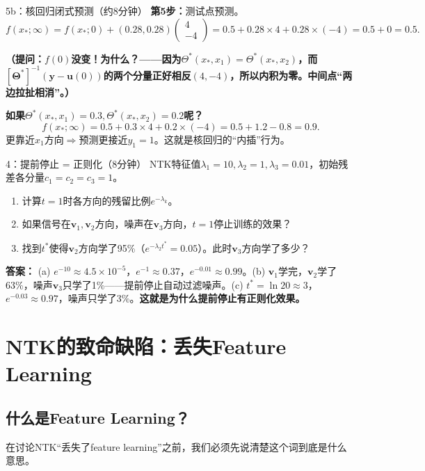 \documentclass[11pt,a4paper]{article}
\newcommand{\bTheta}{\boldsymbol{\Theta}}
\newcommand{\bu}{\mathbf{u}}
\newcommand{\by}{\mathbf{y}}
\newcommand{\bv}{\mathbf{v}}
\begin{document}
\begin{handcalc}{5b：核回归闭式预测（约8分钟）}
\textbf{第5步：}测试点预测。
\[
f(x_*;\infty) = f(x_*;0) + (0.28, 0.28)\begin{pmatrix}4\\-4\end{pmatrix} = 0.5 + 0.28\times 4 + 0.28\times(-4) = 0.5 + 0 = 0.5.
\]

\textbf{（提问：$f(0)$没变！为什么？——因为$\Theta^*(x_*,x_1)=\Theta^*(x_*,x_2)$，而$[\bTheta^*]^{-1}(\by-\bu(0))$的两个分量正好相反$(4,-4)$，所以内积为零。中间点``两边拉扯相消''。）}

\textbf{如果$\Theta^*(x_*,x_1)=0.3, \Theta^*(x_*,x_2)=0.2$呢？}
\[
f(x_*;\infty) = 0.5 + 0.3\times 4 + 0.2\times(-4) = 0.5 + 1.2 - 0.8 = 0.9.
\]
更靠近$x_1$方向$\Rightarrow$预测更接近$y_1=1$。这就是核回归的``内插''行为。
\end{handcalc}

\begin{classexercise}{4：提前停止 = 正则化（8分钟）}
NTK特征值$\lambda_1=10, \lambda_2=1, \lambda_3=0.01$，初始残差各分量$c_1=c_2=c_3=1$。
\begin{enumerate}[label=(\alph*)]
\item 计算$t=1$时各方向的残留比例$e^{-\lambda_k}$。
\item 如果信号在$\bv_1,\bv_2$方向，噪声在$\bv_3$方向，$t=1$停止训练的效果？
\item 找到$t^*$使得$\bv_2$方向学了95\%（$e^{-\lambda_2 t^*}=0.05$）。此时$\bv_3$方向学了多少？
\end{enumerate}

\textbf{答案：} (a) $e^{-10}\approx 4.5\times 10^{-5}$，$e^{-1}\approx 0.37$，$e^{-0.01}\approx 0.99$。(b) $\bv_1$学完，$\bv_2$学了63\%，噪声$\bv_3$只学了1\%——提前停止自动过滤噪声。(c) $t^*=\ln 20\approx 3$，$e^{-0.03}\approx 0.97$，噪声只学了3\%。\textbf{这就是为什么提前停止有正则化效果。}
\end{classexercise}

\section{NTK的致命缺陷：丢失Feature Learning}

\subsection{什么是Feature Learning？}

在讨论NTK``丢失了feature learning''之前，我们必须先说清楚这个词到底是什么意思。
\end{document}
